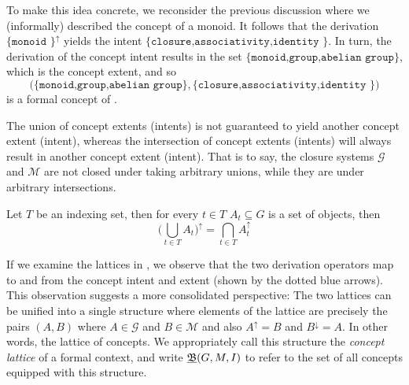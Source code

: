 To make this idea concrete, we reconsider the previous discussion where we (informally) described the concept of a monoid.
It follows that the derivation $\{\texttt{monoid }\}^{\uparrow}$ yields the intent
$\{\texttt{closure,associativity,identity }\}$. In turn, the derivation of the concept intent results in the set
$\{\texttt{monoid,group,abelian group}\}$, which is the concept extent, and so
\[
	\big(\{\texttt{monoid,group,abelian group}\}, \{\texttt{closure,associativity,identity }\}\big)
\]
is a formal concept of .

The union of concept extents (intents) is not guaranteed to yield another concept extent (intent), whereas the intersection
of concept extents (intents) will always result in another concept extent (intent). That is to say, the closure systems $\mathcal{G}$
and $\mathcal{M}$ are not closed under taking arbitrary unions, while they are under arbitrary intersections.

\begin{proposition}
	\label{proposition:intersection-union-concepts} Let $T$ be an indexing set, then for every $t \in T$
	$A_{t}\subseteq G$ is a set of objects, then
	\[
		\big( \underset{t \in T}\bigcup A_{t}\big)^{\uparrow}= \underset{t \in T}\bigcap A_{t}^{\uparrow}
	\]
\end{proposition}

If we examine the lattices in , we observe that the two derivation operators map to and from
the concept intent and extent (shown by the dotted blue arrows). This observation suggests a more consolidated perspective:
The two lattices can be unified into a single structure where elements of the lattice are precisely the pairs $(A,B)$
where $A \in \mathcal{G}$ and $B \in \mathcal{M}$ and also $A^{\uparrow}= B$ and $B^{\downarrow}= A$. In other words,
the lattice of concepts. We appropriately call this structure the \textit{concept lattice} of a formal context, and write
$\underline{{\mathfrak B}} (G,M,\mathrel{I})$ to refer to the set of all concepts equipped with this structure.

